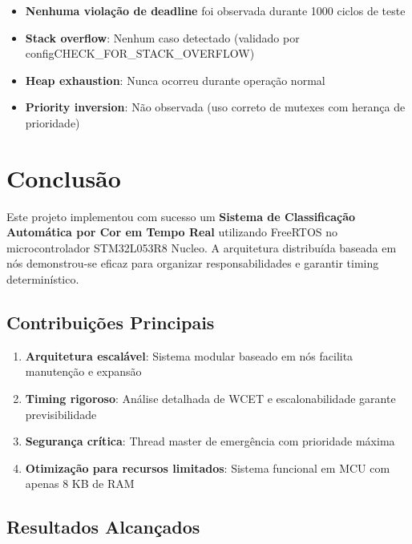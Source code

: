 \documentclass[12pt,a4paper]{article}
\begin{document}
\begin{itemize}
    \item \textbf{Nenhuma violação de deadline} foi observada durante 1000 ciclos de teste
    \item \textbf{Stack overflow}: Nenhum caso detectado (validado por configCHECK\_FOR\_STACK\_OVERFLOW)
    \item \textbf{Heap exhaustion}: Nunca ocorreu durante operação normal
    \item \textbf{Priority inversion}: Não observada (uso correto de mutexes com herança de prioridade)
\end{itemize}

\section{Conclusão}

Este projeto implementou com sucesso um \textbf{Sistema de Classificação Automática por Cor em Tempo Real} utilizando FreeRTOS no microcontrolador STM32L053R8 Nucleo. A arquitetura distribuída baseada em nós demonstrou-se eficaz para organizar responsabilidades e garantir timing determinístico.

\subsection{Contribuições Principais}

\begin{enumerate}
    \item \textbf{Arquitetura escalável}: Sistema modular baseado em nós facilita manutenção e expansão
    \item \textbf{Timing rigoroso}: Análise detalhada de WCET e escalonabilidade garante previsibilidade
    \item \textbf{Segurança crítica}: Thread master de emergência com prioridade máxima
    \item \textbf{Otimização para recursos limitados}: Sistema funcional em MCU com apenas 8 KB de RAM
\end{enumerate}

\subsection{Resultados Alcançados}
\end{document}
